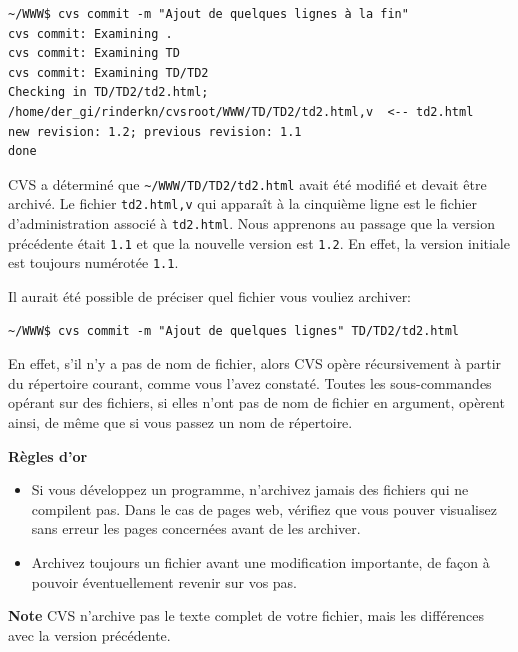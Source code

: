 \documentclass[11pt,a4paper]{article}
\begin{document}
{\small
\begin{verbatim}
~/WWW$ cvs commit -m "Ajout de quelques lignes à la fin"
cvs commit: Examining .
cvs commit: Examining TD
cvs commit: Examining TD/TD2
Checking in TD/TD2/td2.html;
/home/der_gi/rinderkn/cvsroot/WWW/TD/TD2/td2.html,v  <-- td2.html
new revision: 1.2; previous revision: 1.1
done
\end{verbatim}
}

CVS a déterminé que \verb|~/WWW/TD/TD2/td2.html| avait été modifié et
devait être archivé. Le fichier \texttt{td2.html,v} qui apparaît à la
cinquième ligne est le fichier d'administration associé à
\texttt{td2.html}. Nous apprenons au passage que la version précédente
était \texttt{1.1} et que la nouvelle version est \texttt{1.2}. En
effet, la version initiale est toujours numérotée \texttt{1.1}.

\bigskip

\noindent Il aurait été possible de préciser quel fichier vous vouliez
archiver:

{\small
\begin{verbatim}
~/WWW$ cvs commit -m "Ajout de quelques lignes" TD/TD2/td2.html
\end{verbatim}
}

\noindent
En effet, s'il n'y a pas de nom de fichier, alors CVS opère
récursivement à partir du répertoire courant, comme vous l'avez
constaté. Toutes les sous-commandes opérant sur des fichiers, si elles
n'ont pas de nom de fichier en argument, opèrent ainsi, de même que si
vous passez un nom de répertoire.

\bigskip

\noindent \textbf{Règles d'or}

\begin{itemize}

  \item Si vous développez un programme, n'archivez jamais des
  fichiers qui ne compilent pas. Dans le cas de pages web, vérifiez
  que vous pouver visualisez sans erreur les pages concernées avant de
  les archiver.

  \item Archivez toujours un fichier avant une modification
  importante, de façon à pouvoir éventuellement revenir sur vos pas.

\end{itemize}

\noindent \textbf{Note} CVS n'archive pas le texte complet de votre
fichier, mais les différences avec la version précédente.
\end{document}
